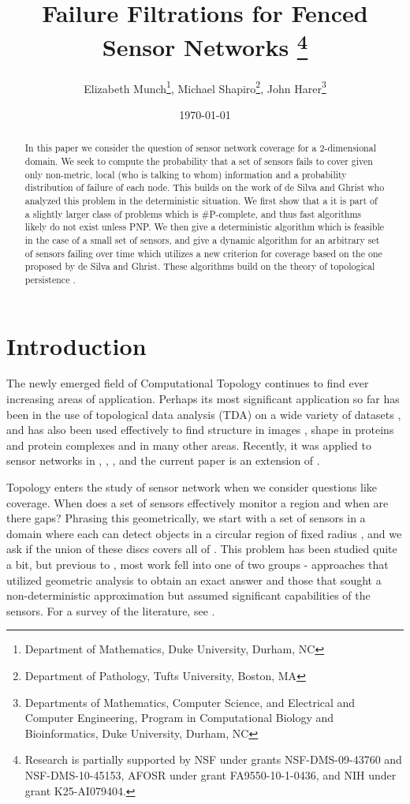 \documentclass[10pt,twocolumn]{article} \usepackage{amsmath,epsf,amssymb,cite,pifont,amsthm, mathrsfs,epsfig,  bbm, amsthm,  setspace}
\title{Failure Filtrations for Fenced Sensor Networks
\footnote{Research is partially supported by NSF under grants 
NSF-DMS-09-43760 and
NSF-DMS-10-45153, 
AFOSR  under grant  FA9550-10-1-0436, 
and
NIH under grant K25-AI079404.
}}
\author{Elizabeth Munch\footnote{Department of Mathematics, Duke University, Durham, NC},  Michael Shapiro\footnote{Department of Pathology, Tufts University, Boston, MA}, John Harer\footnote{Departments of Mathematics, Computer Science, and Electrical and Computer Engineering, Program in Computational Biology and Bioinformatics, Duke University, Durham, NC}}
\date{\today}
\renewcommand{\1}{\mathbbm{1}}
\begin{document}
\maketitle

\begin{abstract}

In this paper we consider the question of sensor network coverage for  a 2-dimensional domain.
We seek to compute the probability  that a set of sensors fails to cover given only
non-metric, local (who is talking to whom) information
and a probability distribution of failure of each node.
This builds on the work of de Silva and Ghrist who analyzed this
problem in the deterministic situation.
We first show that a it is part of a slightly larger class of problems which is \#P-complete, and thus fast algorithms likely do not exist unless PNP.
We then give a deterministic algorithm which is feasible in the case of a small set of sensors,
and give a dynamic algorithm for an arbitrary set of sensors failing over time which utilizes a new criterion for coverage based on the one proposed by de Silva and Ghrist.
These algorithms build on the theory of topological persistence
\cite{Edelsbrunner2010}.

\end{abstract}



\section{Introduction}


The newly emerged field of Computational Topology \cite{Edelsbrunner2010} continues to find ever
increasing areas of application.
Perhaps its most significant application so far has been in the use of topological data analysis (TDA) on a wide variety
of datasets   \cite{Edelsbrunner2010} \cite{Carlsson2009} \cite{Chazal2009},
and has also been used effectively to find
structure in images \cite{Carlsson2008}\cite{Edelsbrunner2009},
shape in proteins and protein complexes \cite{Agarwal2006}\cite{Ban2004}\cite{Headd2007}
and in many other areas.
Recently, it was applied to sensor networks in \cite{Ghrist2005}, \cite{DeSilva2006}, \cite{DeSilva2007},\cite{Tahbaz-Salehi2010}
and the current paper is an extension of \cite{DeSilva2006}. 

Topology enters the study of sensor network when we consider questions like coverage.
When does a set of sensors effectively monitor a region and when are there gaps?
Phrasing this geometrically,
we start with a set of sensors  in a domain 
where each can detect objects in a circular region of fixed radius ,
and we ask if the union of these discs covers all of .
This problem has been studied quite a bit,
but previous to \cite{DeSilva2006}, most work fell into one of two groups -
approaches that utilized geometric analysis to obtain an exact answer
and those that sought a non-deterministic approximation but assumed
significant capabilities of the sensors.
For a survey of the literature, see \cite{Yick2008}.
\end{document}
